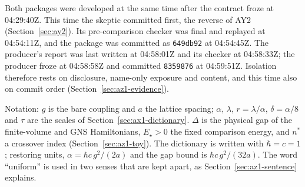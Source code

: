 Both packages were developed at the same time after the contract froze at
04:29:40Z. This time the skeptic committed first, the reverse of AY2
(Section~\ref{sec:ay2}). Its pre-comparison checker was final and replayed at
04:54:11Z, and the package was committed as \texttt{649db92} at 04:54:45Z. The
producer's report was last written at 04:58:01Z and its checker at 04:58:33Z;
the producer froze at 04:58:58Z and committed \texttt{8359876} at 04:59:51Z.
Isolation therefore rests on disclosure, name-only exposure and content, and
this time also on commit order (Section~\ref{sec:az1-evidence}).

Notation: $g$ is the bare coupling and $a$ the lattice spacing; $\alpha$,
$\lambda$, $r=\lambda/\alpha$, $\delta=\alpha/8$ and $\tau$ are the scales of
Section~\ref{sec:ax1-dictionary}. $\Delta$ is the physical gap of the
finite-volume and GNS Hamiltonians, $E_\star>0$ the fixed comparison energy,
and $n^*$ a crossover index (Section~\ref{sec:az1-toy}). The dictionary is
written with $\hbar=c=1$; restoring units, $\alpha=\hbar c\,g^2/(2a)$ and the
gap bound is $\hbar c\,g^2/(32a)$. The word ``uniform'' is used in two senses
that are kept apart, as Section~\ref{sec:az1-sentence} explains.

